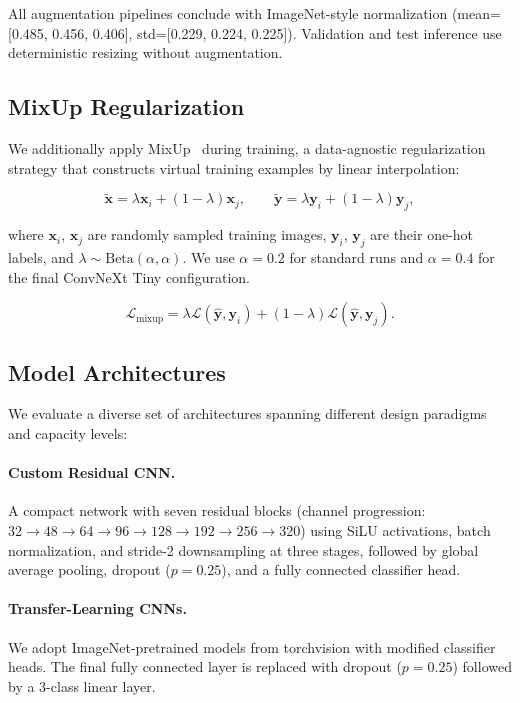 \documentclass[10pt,twocolumn,letterpaper]{article}
\begin{document}
All augmentation pipelines conclude with ImageNet-style normalization (mean=[0.485, 0.456, 0.406], std=[0.229, 0.224, 0.225]). Validation and test inference use deterministic resizing without augmentation.

\subsection{MixUp Regularization}

We additionally apply MixUp~\cite{mixup2018} during training, a data-agnostic regularization strategy that constructs virtual training examples by linear interpolation:

\begin{equation}
    \tilde{\mathbf{x}} = \lambda \mathbf{x}_i + (1-\lambda) \mathbf{x}_j, \qquad
    \tilde{\mathbf{y}} = \lambda \mathbf{y}_i + (1-\lambda) \mathbf{y}_j,
\end{equation}

where $\mathbf{x}_i$, $\mathbf{x}_j$ are randomly sampled training images, $\mathbf{y}_i$, $\mathbf{y}_j$ are their one-hot labels, and $\lambda \sim \text{Beta}(\alpha, \alpha)$. We use $\alpha = 0.2$ for standard runs and $\alpha = 0.4$ for the final ConvNeXt Tiny configuration.

\begin{equation}
    \mathcal{L}_{\text{mixup}} = \lambda \mathcal{L}(\hat{\mathbf{y}}, \mathbf{y}_i) + (1-\lambda) \mathcal{L}(\hat{\mathbf{y}}, \mathbf{y}_j).
\end{equation}

\subsection{Model Architectures}

We evaluate a diverse set of architectures spanning different design paradigms and capacity levels:

\paragraph{Custom Residual CNN.} A compact network with seven residual blocks (channel progression: $32 \to 48 \to 64 \to 96 \to 128 \to 192 \to 256 \to 320$) using SiLU activations, batch normalization, and stride-2 downsampling at three stages, followed by global average pooling, dropout ($p=0.25$), and a fully connected classifier head.

\paragraph{Transfer-Learning CNNs.} We adopt ImageNet-pretrained models from torchvision with modified classifier heads. The final fully connected layer is replaced with dropout ($p=0.25$) followed by a 3-class linear layer.
\end{document}
